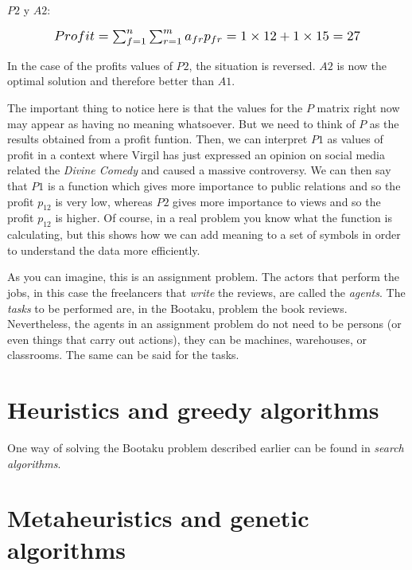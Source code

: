 $P2$ y $A2$:

\begin{equation}
    \scalebox{1.2}{$Profit = \sum_{f=1}^n \sum_{r=1}^m a_{fr} p_{fr} = 1 \times 12 + 1 \times 15 = 27$}
\end{equation}

In the case of the profits values of $P2$, the situation is reversed. $A2$ is now the optimal solution and therefore better than $A1$.

The important thing to notice here is that the values for the $P$ matrix right now may appear as having no meaning whatsoever. But we need to think of $P$ as the results obtained from a profit funtion. Then, we can interpret $P1$ as values of profit in a context where Virgil has just expressed an opinion on social media related the \textit{Divine Comedy} and caused a massive controversy. We can then say that $P1$ is a function which gives more importance to public relations and so the profit $p_{12}$ is very low, whereas $P2$ gives more importance to views and so the profit $p_{12}$ is higher. Of course, in a real problem you know what the function is calculating, but this shows how we can add meaning to a set of symbols in order to understand the data more efficiently.

As you can imagine, this is an assignment problem. The actors that perform the jobs, in this case the freelancers that \textit{write} the reviews, are called the \textit{agents}. The \textit{tasks} to be performed are, in the Bootaku, problem the book reviews. Nevertheless, the agents in an assignment problem do not need to be persons (or even things that carry out actions), they can be machines, warehouses, or classrooms. The same can be said for the tasks.


\section{Heuristics and greedy algorithms}

One way of solving the Bootaku problem described earlier can be found in \textit{search algorithms}.


\section{Metaheuristics and genetic algorithms}



